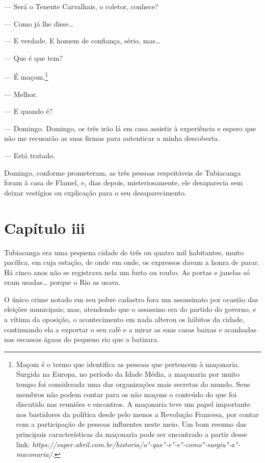 --- Será o Tenente Carvalhais, o coletor, conhece?

--- Como já lhe disse\ldots{}

--- E verdade. E homem de confiança, sério, mas\ldots{}

--- Que é que tem?

--- É maçom.\footnote{Maçom é o termo que identifica as pessoas que
  pertencem à maçonaria. Surgida na Europa, no período da Idade Média, a
  maçonaria por muito tempo foi considerada uma das organizações mais
  secretas do mundo. Seus membros não podem contar para os não maçons o
  conteúdo do que foi discutido nas reuniões e encontros. A maçonaria
  teve um papel importante nos bastidores da política desde pelo menos a
  Revolução Francesa, por contar com a participação de pessoas
  influentes neste meio. Um bom resumo das principais características da
  maçonaria pode ser encontrado a partir desse link:
  \emph{https://super.abril.com.br/historia/o"-que"-e"-e"-como"-surgiu"-a"-maconaria/}.}

--- Melhor.

--- E quando é?

--- Domingo. Domingo, os três irão lá em casa assistir à experiência e
espero que não me recusarão as suas firmas para autenticar a minha
descoberta.

--- Está tratado.

Domingo, conforme prometeram, as três pessoas respeitáveis de Tubiacanga
foram à casa de Flamel, e, dias depois, misteriosamente, ele desaparecia
sem deixar vestígios ou explicação para o seu desaparecimento.

\section*{Capítulo iii}

Tubiacanga era uma pequena cidade de três ou quatro mil habitantes,
muito pacífica, em cuja estação, de onde em onde, os expressos davam a
honra de parar. Há cinco anos não se registrava nela um furto ou roubo.
As portas e janelas só eram usadas\ldots{} porque o Rio as usava.

O único crime notado em seu pobre cadastro fora um assassinato por
ocasião das eleições municipais; mas, atendendo que o assassino era do
partido do governo, e a vítima da oposição, o acontecimento em nada
alterou os hábitos da cidade, continuando ela a exportar o seu café e a
mirar as suas casas baixas e acanhadas nas escassas águas do pequeno rio
que a batizara.

